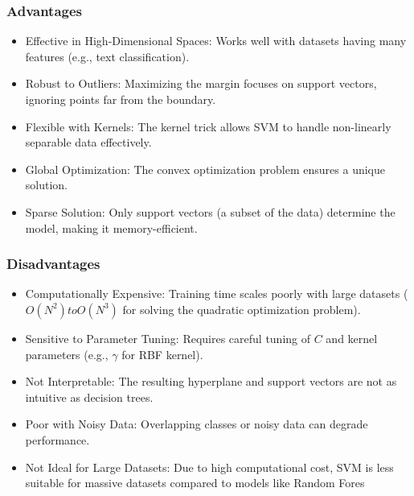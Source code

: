 \smallskip

\subsubsection{Advantages}\textbf{}

\begin{itemize}
    \item Effective in High-Dimensional Spaces: Works well with datasets having many features (e.g., text classification).
    \item Robust to Outliers: Maximizing the margin focuses on support vectors, ignoring points far from the boundary.
    \item Flexible with Kernels: The kernel trick allows SVM to handle non-linearly separable data effectively.
    \item Global Optimization: The convex optimization problem ensures a unique solution.
    \item Sparse Solution: Only support vectors (a subset of the data) determine the model, making it memory-efficient.
\end{itemize}

\subsubsection{Disadvantages}\textbf{}

\begin{itemize}
    \item Computationally Expensive: Training time scales poorly with large datasets ($O(N^2) to O(N^3)$ for solving the quadratic optimization problem).
    \item Sensitive to Parameter Tuning: Requires careful tuning of $C$ and kernel parameters (e.g., $\gamma$ for RBF kernel).
    \item Not Interpretable: The resulting hyperplane and support vectors are not as intuitive as decision trees.
    \item Poor with Noisy Data: Overlapping classes or noisy data can degrade performance.
    \item Not Ideal for Large Datasets: Due to high computational cost, SVM is less suitable for massive datasets compared to models like Random Fores
\end{itemize}